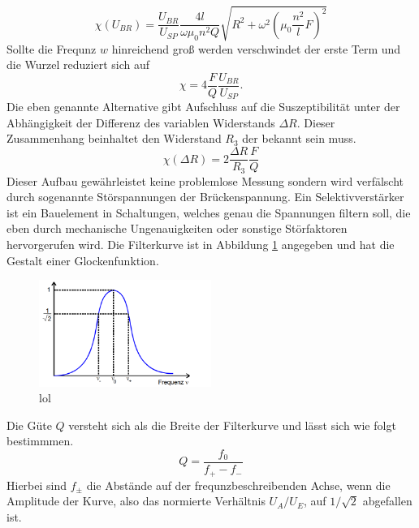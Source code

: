\begin{equation*}
    \label{eqn:werdasliestistOMEGAdummXD}
    \chi(U_{BR})= \frac{U_{BR}}{U_{SP}} \frac{4l}{\omega \mu_0 n^2 Q} \sqrt{R^2+\omega^2 \left( \mu_0 \frac{n^2}{l}F \right)^2}
\end{equation*}
Sollte die Frequnz $w$ hinreichend groß werden verschwindet der erste Term und die Wurzel reduziert sich auf 
\begin{equation}
    \label{eq:XD}
     \chi = 4 \frac{F}{Q}\frac{U_{BR}}{U_{SP}}.
\end{equation}
Die eben genannte Alternative gibt Aufschluss auf die Suszeptibilität unter der Abhängigkeit der Differenz des variablen Widerstands %
$\Delta R$. Dieser Zusammenhang beinhaltet den Widerstand $R_3$ der bekannt sein muss.
\begin{equation}
    \label{eqn:werdasliestistOMEGAundGIGAdummXD}
    \chi(\Delta R) = 2 \frac{\Delta R}{R_3}\frac{F}{Q}
\end{equation}
Dieser Aufbau gewährleistet keine problemlose Messung sondern wird verfälscht durch sogenannte Störspannungen der Brückenspannung.
Ein Selektivverstärker ist ein Bauelement in Schaltungen, welches genau die Spannungen filtern soll, die eben durch mechanische Ungenauigkeiten 
oder sonstige Störfaktoren hervorgerufen wird. Die Filterkurve ist in Abbildung \ref{fig:glocke} angegeben und hat die Gestalt einer Glockenfunktion.
\begin{figure}
    \centering
    \includegraphics[width=0.5\textwidth]{bilder/glocke.png}
    \caption{lol}
    \label{fig:glocke}
\end{figure}
Die Güte $Q$ versteht sich als die Breite der Filterkurve und lässt sich wie folgt bestimmmen.
\begin{equation}
    \label{eq:achduliebeGüte}    
    Q= \frac{f_0}{f_+ - f_-}
\end{equation}
Hierbei sind $f_{\pm}$ die Abstände auf der frequnzbeschreibenden Achse, wenn die Amplitude der Kurve, also das normierte Verhältnis $U_A/U_E$,
auf $1/\sqrt{2}$ abgefallen ist.